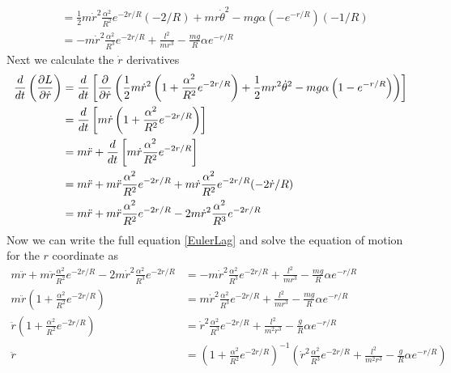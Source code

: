 \documentclass[11pt]{article}
\numberwithin{equation}{section}
\begin{document}
\begin{enumerate}[(a)]
\begin{align*}
&= \frac{1}{2}m\dot{r}^2\frac{\alpha^2}{R^2}e^{-2r/R}(-2/R) + mr\dot{\theta}^2 - mg\alpha\left(-e^{-r/R}\right)(-1/R)\\
&= -m\dot{r}^2\frac{\alpha^2}{R^3}e^{-2r/R} + \frac{l^2}{mr^3} - \frac{mg}{R}\alpha e^{-r/R}
\end{align*}
Next we calculate the $\dot{r}$ derivatives
\begin{align*}
\frac{d}{dt}\left(\frac{\partial{L}}{\partial{\dot{r}}}\right) &= \frac{d}{dt}\left[\frac{\partial{}}{\partial{\dot{r}}}\left(\frac{1}{2}m\dot{r}^2 \left(1 + \frac{\alpha^2}{R^2}e^{-2r/R}\right) + \frac{1}{2}mr^2\dot{\theta}^2 - mg\alpha\left(1-e^{-r/R}\right)\right)\right]\\
&= \frac{d}{dt}\left[m\dot{r}\left(1 + \frac{\alpha^2}{R^2}e^{-2r/R}\right)\right]\\  
&= m\ddot{r} + \frac{d}{dt}\left[m\dot{r}\frac{\alpha^2}{R^2}e^{-2r/R}\right]\\  
&= m\ddot{r} + m\ddot{r}\frac{\alpha^2}{R^2}e^{-2r/R}+ m\dot{r}\frac{\alpha^2}{R^2}e^{-2r/R}(-2\dot{r}/R)\\
&= m\ddot{r} + m\ddot{r}\frac{\alpha^2}{R^2}e^{-2r/R} - 2m\dot{r}^2\frac{\alpha^2}{R^3}e^{-2r/R}
\end{align*}
Now we can write the full equation \ref{EulerLag} and solve the equation of motion for the 
$r$ coordinate as
\begin{align*}
m\ddot{r} + m\ddot{r}\frac{\alpha^2}{R^2}e^{-2r/R} - 2m\dot{r}^2\frac{\alpha^2}{R^3}e^{-2r/R} &= -m\dot{r}^2\frac{\alpha^2}{R^3}e^{-2r/R} + \frac{l^2}{mr^3} - \frac{mg}{R}\alpha e^{-r/R}\\
m\ddot{r}\left(1 + \frac{\alpha^2}{R^2}e^{-2r/R}\right)  &= m\dot{r}^2\frac{\alpha^2}{R^3}e^{-2r/R} + \frac{l^2}{mr^3} - \frac{mg}{R}\alpha e^{-r/R}\\
\ddot{r}\left(1 + \frac{\alpha^2}{R^2}e^{-2r/R}\right)  &= \dot{r}^2\frac{\alpha^2}{R^3}e^{-2r/R} + \frac{l^2}{m^2r^3} - \frac{g}{R}\alpha e^{-r/R}\\
\ddot{r} &= \left(1 + \frac{\alpha^2}{R^2}e^{-2r/R}\right)^{-1}\left(\dot{r}^2\frac{\alpha^2}{R^3}e^{-2r/R} + \frac{l^2}{m^2r^3} - \frac{g}{R}\alpha e^{-r/R}\right)
\end{align*}


\end{enumerate}
\end{document}
